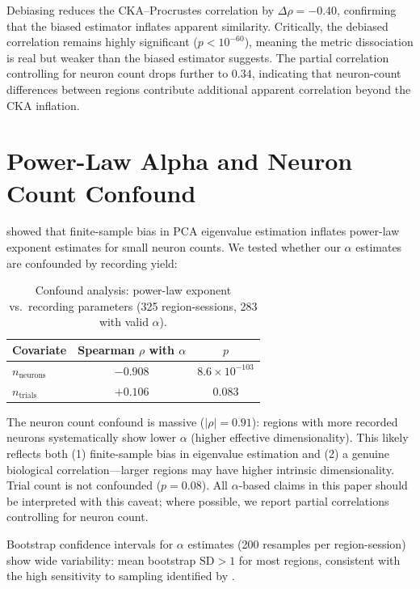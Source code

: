 \documentclass{article}
\begin{document}
Debiasing reduces the CKA--Procrustes correlation by $\Delta\rho = -0.40$, confirming that the biased estimator inflates apparent similarity. Critically, the debiased correlation remains highly significant ($p < 10^{-60}$), meaning the metric dissociation is real but weaker than the biased estimator suggests. The partial correlation controlling for neuron count drops further to $0.34$, indicating that neuron-count differences between regions contribute additional apparent correlation beyond the CKA inflation.

\section{Power-Law Alpha and Neuron Count Confound}
\label{app:alpha_bias}

\citet{chun2025dimensionality} showed that finite-sample bias in PCA eigenvalue estimation inflates power-law exponent estimates for small neuron counts. We tested whether our $\alpha$ estimates are confounded by recording yield:

\begin{table}[h]
\centering
\small
\caption{Confound analysis: power-law exponent vs.\ recording parameters (325 region-sessions, 283 with valid $\alpha$).}
\label{tab:alpha_confound}
\begin{tabular}{@{}lcc@{}}
\toprule
\textbf{Covariate} & \textbf{Spearman $\rho$ with $\alpha$} & \textbf{$p$} \\
\midrule
$n_{\text{neurons}}$ & $-0.908$ & $8.6 \times 10^{-103}$ \\
$n_{\text{trials}}$ & $+0.106$ & $0.083$ \\
\bottomrule
\end{tabular}
\end{table}

The neuron count confound is massive ($|\rho| = 0.91$): regions with more recorded neurons systematically show lower $\alpha$ (higher effective dimensionality). This likely reflects both (1) finite-sample bias in eigenvalue estimation and (2) a genuine biological correlation---larger regions may have higher intrinsic dimensionality. Trial count is not confounded ($p = 0.08$). All $\alpha$-based claims in this paper should be interpreted with this caveat; where possible, we report partial correlations controlling for neuron count.

Bootstrap confidence intervals for $\alpha$ estimates (200 resamples per region-session) show wide variability: mean bootstrap $\text{SD} > 1$ for most regions, consistent with the high sensitivity to sampling identified by \citet{chun2025dimensionality}.
\end{document}
